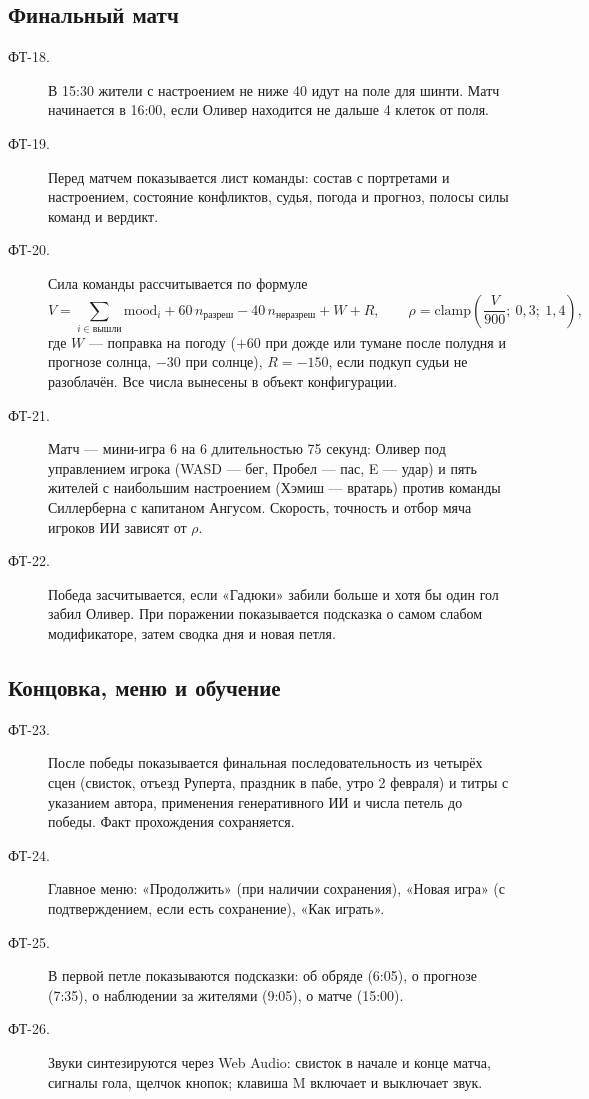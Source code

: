 \documentclass[12pt]{article}
\begin{document}
\subsection{Финальный матч}
\begin{description}
\item[ФТ-18.] В 15:30 жители с настроением не ниже 40 идут на поле для шинти. Матч начинается в 16:00, если Оливер находится не дальше 4 клеток от поля.
\item[ФТ-19.] Перед матчем показывается лист команды: состав с портретами и настроением, состояние конфликтов, судья, погода и прогноз, полосы силы команд и вердикт.
\item[ФТ-20.] Сила команды рассчитывается по формуле
\[
V = \sum_{i\in\text{вышли}} \mathrm{mood}_i + 60\,n_{\text{разреш}} - 40\,n_{\text{неразреш}} + W + R,\qquad
\rho = \mathrm{clamp}\!\left(\frac{V}{900};\ 0{,}3;\ 1{,}4\right),
\]
где $W$ — поправка на погоду ($+60$ при дожде или тумане после полудня и прогнозе солнца, $-30$ при солнце), $R = -150$, если подкуп судьи не разоблачён. Все числа вынесены в объект конфигурации.
\item[ФТ-21.] Матч — мини-игра 6 на 6 длительностью 75 секунд: Оливер под управлением игрока (WASD — бег, Пробел — пас, E — удар) и пять жителей с наибольшим настроением (Хэмиш — вратарь) против команды Силлерберна с капитаном Ангусом. Скорость, точность и отбор мяча игроков ИИ зависят от $\rho$.
\item[ФТ-22.] Победа засчитывается, если «Гадюки» забили больше и хотя бы один гол забил Оливер. При поражении показывается подсказка о самом слабом модификаторе, затем сводка дня и новая петля.
\end{description}

\subsection{Концовка, меню и обучение}
\begin{description}
\item[ФТ-23.] После победы показывается финальная последовательность из четырёх сцен (свисток, отъезд Руперта, праздник в пабе, утро 2 февраля) и титры с указанием автора, применения генеративного ИИ и числа петель до победы. Факт прохождения сохраняется.
\item[ФТ-24.] Главное меню: «Продолжить» (при наличии сохранения), «Новая игра» (с подтверждением, если есть сохранение), «Как играть».
\item[ФТ-25.] В первой петле показываются подсказки: об обряде (6:05), о прогнозе (7:35), о наблюдении за жителями (9:05), о матче (15:00).
\item[ФТ-26.] Звуки синтезируются через Web Audio: свисток в начале и конце матча, сигналы гола, щелчок кнопок; клавиша M включает и выключает звук.
\end{description}
\end{document}
